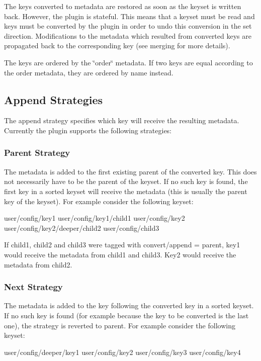 The keys converted to metadata are restored as soon as the keyset is written back. However, the plugin is stateful. This means that a keyset must be read and keys must be converted by the plugin in order to undo this conversion in the set direction. Modifications to the metadata which resulted from converted keys are propagated back to the corresponding key (see merging for more details).

The keys are ordered by the \char`\"{}order\char`\"{} metadata. If two keys are equal according to the order metadata, they are ordered by name instead.

\subsection*{Append Strategies}

The append strategy specifies which key will receive the resulting metadata. Currently the plugin supports the following strategies\+:

\subsubsection*{Parent Strategy}

The metadata is added to the first existing parent of the converted key. This does not necessarily have to be the parent of the keyset. If no such key is found, the first key in a sorted keyset will receive the metadata (this is usually the parent key of the keyset). For example consider the following keyset\+: \begin{DoxyVerb}user/config/key1
user/config/key1/child1
user/config/key2
user/config/key2/deeper/child2
user/config/child3
\end{DoxyVerb}


If child1, child2 and child3 were tagged with {\ttfamily convert/append = parent}, key1 would receive the metadata from child1 and child3. Key2 would receive the metadata from child2.

\subsubsection*{Next Strategy}

The metadata is added to the key following the converted key in a sorted keyset. If no such key is found (for example because the key to be converted is the last one), the strategy is reverted to parent. For example consider the following keyset\+: \begin{DoxyVerb}user/config/deeper/key1
user/config/key2
user/config/key3
user/config/key4
\end{DoxyVerb}


